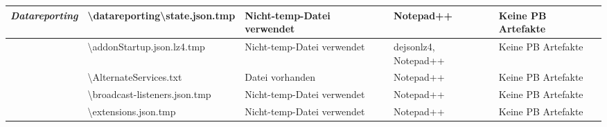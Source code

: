 \begin{appendices}
{\begin{landscape}
\begin{table}[h!]
{\begin{tabular}{cllll}
							\multicolumn{1}{|c|}{\multirow{-2}{*}{\textit{Datareporting}}}                                                & \multicolumn{1}{l|}{\cellcolor[HTML]{3190FF}\textbackslash{}datareporting\textbackslash{}state.json.tmp}                                       & \multicolumn{1}{l|}{\cellcolor[HTML]{FCFF2F}Nicht-temp-Datei verwendet} & \multicolumn{1}{l|}{\cellcolor[HTML]{FFFFFF}Notepad++}            & \multicolumn{1}{l|}{\cellcolor[HTML]{F8A102}Keine PB Artefakte} \\ \hline
							\multicolumn{1}{|c|}{}                                                                                        & \multicolumn{1}{l|}{\cellcolor[HTML]{3190FF}\textbackslash{}addonStartup.json.lz4.tmp}                                                         & \multicolumn{1}{l|}{\cellcolor[HTML]{FCFF2F}Nicht-temp-Datei verwendet} & \multicolumn{1}{l|}{\cellcolor[HTML]{FFFFFF}dejsonlz4, Notepad++} & \multicolumn{1}{l|}{\cellcolor[HTML]{F8A102}Keine PB Artefakte} \\ \cline{2-5} 
							\multicolumn{1}{|c|}{}                                                                                        & \multicolumn{1}{l|}{\cellcolor[HTML]{3190FF}\textbackslash{}AlternateServices.txt}                                                             & \multicolumn{1}{l|}{\cellcolor[HTML]{009901}Datei vorhanden}            & \multicolumn{1}{l|}{\cellcolor[HTML]{FFFFFF}Notepad++}            & \multicolumn{1}{l|}{\cellcolor[HTML]{F8A102}Keine PB Artefakte} \\ \cline{2-5} 
							\multicolumn{1}{|c|}{}                                                                                        & \multicolumn{1}{l|}{\cellcolor[HTML]{3190FF}\textbackslash{}broadcast-listeners.json.tmp}                                                      & \multicolumn{1}{l|}{\cellcolor[HTML]{FCFF2F}Nicht-temp-Datei verwendet} & \multicolumn{1}{l|}{\cellcolor[HTML]{FFFFFF}Notepad++}            & \multicolumn{1}{l|}{\cellcolor[HTML]{F8A102}Keine PB Artefakte} \\ \cline{2-5} 
							\multicolumn{1}{|c|}{}                                                                                        & \multicolumn{1}{l|}{\cellcolor[HTML]{3190FF}\textbackslash{}extensions.json.tmp}                                                               & \multicolumn{1}{l|}{\cellcolor[HTML]{FCFF2F}Nicht-temp-Datei verwendet} & \multicolumn{1}{l|}{\cellcolor[HTML]{FFFFFF}Notepad++}            & \multicolumn{1}{l|}{\cellcolor[HTML]{F8A102}Keine PB Artefakte} \\ \cline{2-5} 

\end{tabular}}
\end{table}
\end{landscape}}
\end{appendices}
